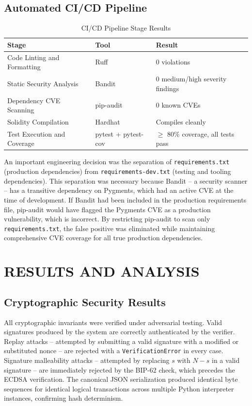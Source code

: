 \documentclass[12pt,a4paper]{report}
\begin{document}
\section{Automated CI/CD Pipeline}

\begin{table}[H]
\centering
\caption{CI/CD Pipeline Stage Results}
\label{tab:ci}
\begin{tabular}{|l|l|l|}
\hline
\textbf{Stage} & \textbf{Tool} & \textbf{Result} \\
\hline
Code Linting and Formatting & Ruff & 0 violations \\
\hline
Static Security Analysis & Bandit & 0 medium/high severity findings \\
\hline
Dependency CVE Scanning & pip-audit & 0 known CVEs \\
\hline
Solidity Compilation & Hardhat & Compiles cleanly \\
\hline
Test Execution and Coverage & pytest + pytest-cov & $\geq$ 80\% coverage, all tests pass \\
\hline
\end{tabular}
\end{table}

An important engineering decision was the separation of \texttt{requirements.txt}
(production dependencies) from \texttt{requirements-dev.txt} (testing and tooling
dependencies). This separation was necessary because Bandit -- a security scanner -- has
a transitive dependency on Pygments, which had an active CVE at the time of development.
If Bandit had been included in the production requirements file, pip-audit would have
flagged the Pygments CVE as a production vulnerability, which is incorrect. By restricting
pip-audit to scan only \texttt{requirements.txt}, the false positive was eliminated while
maintaining comprehensive CVE coverage for all true production dependencies.

\chapter{RESULTS AND ANALYSIS}

\section{Cryptographic Security Results}

All cryptographic invariants were verified under adversarial testing. Valid signatures
produced by the system are correctly authenticated by the verifier. Replay attacks --
attempted by submitting a valid signature with a modified or substituted nonce -- are
rejected with a \texttt{VerificationError} in every case. Signature malleability attacks
-- attempted by replacing $s$ with $N-s$ in a valid signature -- are immediately rejected
by the BIP-62 check, which precedes the ECDSA verification. The canonical JSON
serialization produced identical byte sequences for identical logical transactions across
multiple Python interpreter instances, confirming hash determinism.
\end{document}
